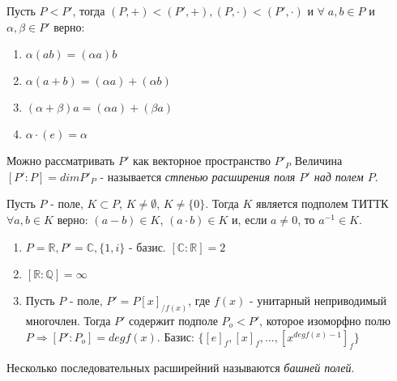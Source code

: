 \begin{defs}
  Пусть $P < P'$, тогда $(P, +) < (P', +), (P, \cdot) < (P', \cdot)$ и $\forall\; a,b \in P$ и $\alpha,\beta \in P'$ верно:
  \begin{enumerate}
    \item $\alpha(ab) = (\alpha a)b$
    \item $\alpha(a+b) = (\alpha a) + (\alpha b)$
    \item $(\alpha+\beta)a = (\alpha a) + (\beta a)$
    \item $\alpha\cdot(e) = \alpha$
  \end{enumerate}
  Можно рассматривать $P'$ как векторное пространство $P'_{P}$
  Величина $[P':P] = dimP'_{P}$ - называется \textit{стпенью расширения поля $P'$ над полем $P$}.
\end{defs}

\begin{proofs}
	Пусть $P$ - поле, $K \subset P$, $K \neq \emptyset$, $K \neq \{0\}$. Тогда $K$ является подполем ТИТТК $\forall a,b \in K$ верно: $(a - b) \in K$, $(a \cdot b) \in K$ и, если $a \neq 0$, то $a^{-1} \in K$. 
\end{proofs}

\begin{example}
  \begin{enumerate}
    \item $P = \mathbb{R}, P' = \mathbb{C}, \{1,i\}$ - базис. $[\mathbb{C}:\mathbb{R}] = 2$
    \item $[\mathbb{R}:\mathbb{Q}] = \infty$
    \item Пусть $P$ - поле, $P' = P[x]_{/f(x)}$, где $f(x)$ - унитарный неприводимый многочлен. Тогда $P'$ содержит подполе $P_{o} < P'$,
    которое изоморфно полю $P \Rightarrow [P':P_{o}] = degf(x)$. Базис: $\{[e]_{f}, [x]_{f}, ... , [x^{degf(x)-1}]_{f}\}$ 
  \end{enumerate}
\end{example}

\begin{defs}
  Несколько последовательных расширейний называются \textit{башней полей}.
\end{defs}

